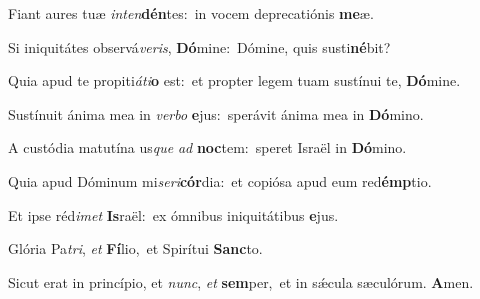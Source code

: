 \vs Fiant aures tuæ \textit{in}\textit{ten}\textbf{dén}tes:~\redgreheightstar in vocem deprecatiónis \textbf{me}æ.

\vs Si iniquitátes observá\textit{ve}\textit{ris}, \textbf{Dó}mine:~\redgreheightstar Dómine, quis susti\textbf{né}bit?

\vs Quia apud te propiti\textit{á}\textit{ti}\textbf{o} est:~\redgreheightstar et propter legem tuam sustínui te, \textbf{Dó}mine.

\vs Sustínuit ánima mea in \textit{ver}\textit{bo} \textbf{e}jus:~\redgreheightstar sperávit ánima mea in \textbf{Dó}mino.

\vs A custódia matutína us\textit{que} \textit{ad} \textbf{noc}tem:~\redgreheightstar speret Israël in \textbf{Dó}mino.

\vs Quia apud Dóminum mi\textit{se}\textit{ri}\textbf{cór}dia:~\redgreheightstar et copiósa apud eum red\textbf{émp}tio.

\vs Et ipse réd\textit{i}\textit{met} \textbf{Is}raël:~\redgreheightstar ex ómnibus iniquitátibus \textbf{e}jus.

\vs Glória Pa\textit{tri}, \textit{et} \textbf{Fí}lio,~\redgreheightstar et Spirítui \textbf{Sanc}to.

\vs Sicut erat in princípio, et \textit{nunc}, \textit{et} \textbf{sem}per,~\redgreheightstar et in sǽcula sæculórum. \textbf{A}men.
